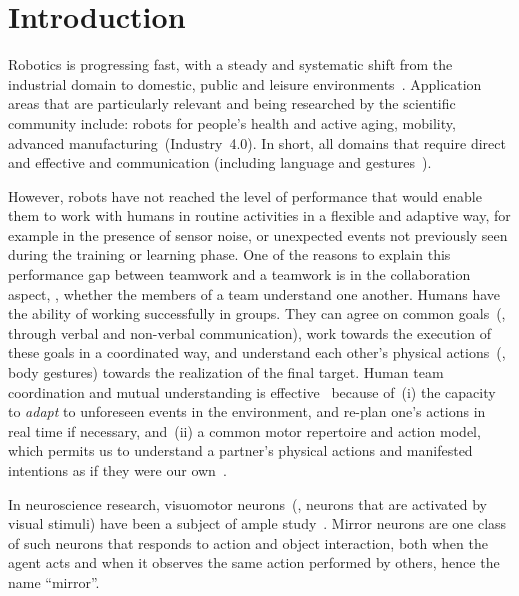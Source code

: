 
\section{Introduction}


Robotics is progressing fast, with a steady and systematic shift from the industrial domain to domestic, public and leisure environments~\cite[ch.~65, Domestic Robotics]{siciliano:2016:handbook2}. Application areas that are particularly relevant and being researched by the scientific community include: robots for people's health and active aging, mobility, advanced manufacturing~(Industry~4.0). In short, all domains that require direct and effective \hri{} and communication (including language and gestures~\cite{matuszek:2014:aaai}).

However, robots have not reached the level of performance that would enable them to work with humans in routine activities in a flexible and adaptive way, for example in the presence of sensor noise, or unexpected events not previously seen during the training or learning phase. One of the reasons to explain this performance gap between \hh{} teamwork and a \hr{} teamwork is in the collaboration aspect, \ie, whether the members of a team understand one another. Humans have the ability of working successfully in groups. They can agree on common goals~(\eg, through verbal and non-verbal communication), work towards the execution of these goals in a coordinated way, and understand each other's physical actions~(\eg, body gestures) towards the realization of the final target. Human team coordination and mutual understanding is effective~\cite{ramnani:2004:natureneuro} because of~(i) the capacity to \emph{adapt} to unforeseen events in the environment, and re-plan one's actions in real time if necessary, and~(ii) a common motor repertoire and action model, which permits us to understand a partner's physical actions and manifested intentions as if they were our own~\cite{saponaro:2013:crhri}.

In neuroscience research, visuomotor neurons~(\ie, neurons that are activated by visual stimuli) have been a subject of ample study~\cite{rizzolatti:2001:nrn}. Mirror neurons are one class of such neurons that responds to action and object interaction, both when the agent acts and when it observes the same action performed by others, hence the name ``mirror''.

